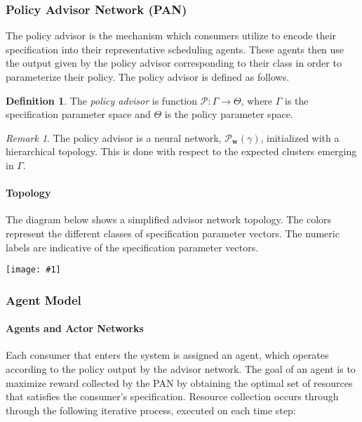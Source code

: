 \documentclass{article}
\theoremstyle{definition}
\newtheorem{definition}{Definition}[section]
\theoremstyle{remark}
\newtheorem*{remark}{Remark}
\newcommand{\addpic}[1]{\texttt{[image: \#1]}}
\begin{document}
			\subsubsection{Policy Advisor Network (PAN)}

			The policy advisor is the mechanism which consumers utilize to encode their specification into their representative scheduling agents. These agents then use the output given by the policy advisor corresponding to their class in order to parameterize their policy. The policy advisor is defined as follows.

			\begin{definition}
				The \emph{policy advisor} is function $\mathcal{P}: \Gamma \rightarrow \Theta$, where $\Gamma$ is the specification parameter space and $\Theta$ is the policy parameter space.
			\end{definition}

			\begin{remark}
				The policy advisor is a neural network, $\mathcal{P}_{\mathbf{w}}(\gamma)$, initialized with a hierarchical topology. This is done with respect to the expected clusters emerging in $\Gamma$.
			\end{remark}


				\paragraph{Topology}

				The diagram below shows a simplified advisor network topology. The colors represent the different classes of specification parameter vectors. The numeric labels are indicative of the specification parameter vectors.

				\addpic{figures/advisor_topology.png}

		\subsubsection{Agent Model}
		
			\paragraph{Agents and Actor Networks}

			Each consumer that enters the system is assigned an agent, which operates according to the policy output by the advisor network. The goal of an agent is to maximize reward collected by the PAN by obtaining the optimal set of resources that satisfies the consumer's specification. Resource collection occurs through through the following iterative process, executed on each time step:
			
\end{document}
